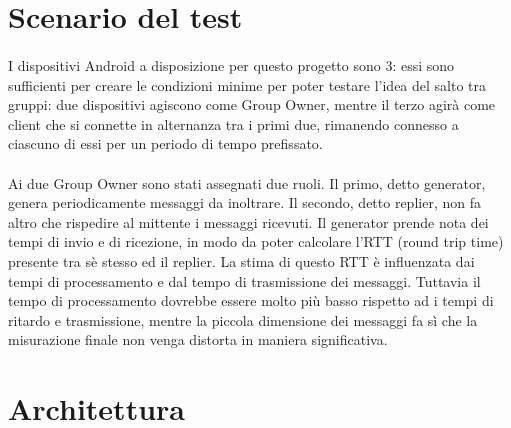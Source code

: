 \documentclass{llncs}
\begin{document}
	
	

\section{Scenario del test}

\paragraph{} I dispositivi Android a disposizione per questo progetto sono 3: essi sono sufficienti per creare le condizioni minime per poter testare l'idea del salto tra gruppi: due dispositivi agiscono come Group Owner, mentre il terzo agirà come client che si connette in alternanza tra i primi due, rimanendo connesso a ciascuno di essi per un periodo di tempo prefissato.

\paragraph{} Ai due Group Owner sono stati assegnati due ruoli. Il primo, detto generator, genera periodicamente messaggi da inoltrare. Il secondo, detto replier, non fa altro che rispedire al mittente i messaggi ricevuti. Il generator prende nota dei tempi di invio e di ricezione, in modo da poter calcolare l'RTT (round trip time) presente tra sè stesso ed il replier. La stima di questo RTT è influenzata dai tempi di processamento e dal tempo di trasmissione dei messaggi. Tuttavia il tempo di processamento dovrebbe essere molto più basso rispetto ad i tempi di ritardo e trasmissione, mentre la piccola dimensione dei messaggi fa sì che la misurazione finale non venga distorta in maniera significativa.



\section{Architettura}
\end{document}
